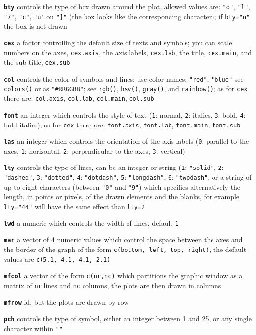 \documentclass[8pt,landscape]{article}
\newcommand{\code}{\texttt}
\newcommand{\bcode}[1]{\texttt{\textbf{#1}}}
\begin{document}
\begin{multicols*}{3}
\bcode{bty}  controls the type of box drawn around the plot, allowed values are: \code{"o"}, \code{"l"}, \code{"7"}, \code{"c"}, \code{"u"} ou \code{"]"} (the box looks like the corresponding character); if \code{bty="n"} the box is not drawn

\bcode{cex}  a factor controlling the default size of texts and symbols; you can scale numbers on the axes, \code{cex.axis}, the axis labels, \code{cex.lab}, the title, \code{cex.main}, and the sub-title, \code{cex.sub}

\bcode{col}  controls the color of symbols and lines; use color names:
\code{"red"}, \code{"blue"} see \code{colors()} or as \code{"\#RRGGBB"};
see \code{rgb()}, \code{hsv()}, \code{gray()}, and \code{rainbow()}; as for \code{cex} there are: \code{col.axis}, \code{col.lab}, \code{col.main}, \code{col.sub}

\bcode{font}  an integer which controls the style of text (\code{1}: normal, \code{2}: italics, \code{3}: bold, \code{4}: bold italics); as for \code{cex} there are: \code{font.axis}, \code{font.lab}, \code{font.main}, \code{font.sub}

\bcode{las}  an integer which controls the orientation of the axis labels (\code{0}: parallel to the axes, \code{1}: horizontal, \code{2}: perpendicular to the axes, \code{3}: vertical)

\bcode{lty}  controls the type of lines, can be an integer or string (\code{1}: \code{"solid"}, \code{2}: \code{"dashed"}, \code{3}: \code{"dotted"}, \code{4}: \code{"dotdash"}, \code{5}: \code{"longdash"}, \code{6}: \code{"twodash"}, or a string of up to eight characters (between \code{"0"} and \code{"9"}) which specifies alternatively the length, in points or pixels, of the drawn elements and the blanks, for example \code{lty="44"} will have the same effect than \code{lty=2}

\bcode{lwd}  a numeric which controls the width of lines, default \code{1}

\bcode{mar}  a vector of 4 numeric values which control the space between the axes and the border of the graph of the form \code{c(bottom, left, top, right)}, the default values are \code{c(5.1, 4.1, 4.1, 2.1)}

\bcode{mfcol}  a vector of the form \code{c(nr,nc)} which partitions the graphic window as a matrix of \code{nr} lines and \code{nc} columns, the plots are then drawn in columns

\bcode{mfrow}  id. but the plots are drawn by row

\bcode{pch}  controls the type of symbol, either an integer between 1
and 25, or any single character within \code{""}


\end{multicols*}
\end{document}
